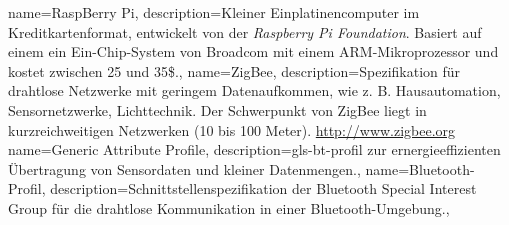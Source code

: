 {
  name={RaspBerry Pi},
  description={Kleiner Einplatinencomputer im Kreditkartenformat, entwickelt von
    der \emph{Raspberry Pi Foundation}.	Basiert auf einem ein Ein-Chip-System von Broadcom
    mit einem ARM-Mikroprozessor und kostet zwischen 25 und 35\$.},
}
{
  name={ZigBee},
  description={Spezifikation für drahtlose Netzwerke mit geringem Datenaufkommen,
    wie z. B. Hausautomation, Sensornetzwerke, Lichttechnik. Der Schwerpunkt von
    ZigBee liegt in kurzreichweitigen Netzwerken (10 bis 100 Meter).
    \newline \url{http://www.zigbee.org}}
}
{
  name={Generic Attribute Profile},
  description={\gls{gls-bt-profil} zur ernergieeffizienten Übertragung von Sensordaten und kleiner
    Datenmengen.},
}
{
  name={Bluetooth-Profil},
  description={Schnittstellenspezifikation der Bluetooth Special Interest Group für die drahtlose
  Kommunikation in einer Bluetooth-Umgebung.},
}


